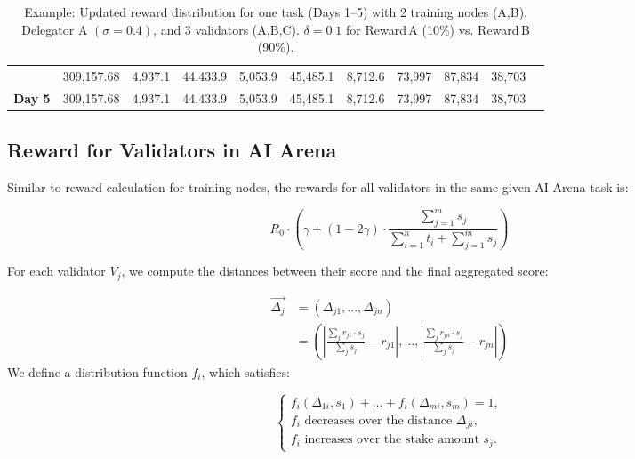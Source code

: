 \documentclass[conference]{IEEEtran}
\newcommand{\SNT}{{AI Arena}\xspace}
\begin{document}
\begin{table}[t]
{\begin{tabular}{lcccccccccc}
& 309,157.68 
& \cellcolor{lightbrown}4,937.1 
& \cellcolor{lightbrown}44,433.9 
& \cellcolor{lightgray}5,053.9 
& \cellcolor{lightgray}45,485.1
& \cellcolor{lightblue}8,712.6
& \cellcolor{lightbrown}73,997 
& \cellcolor{lightgray}87,834 
& \cellcolor{lightblue}38,703 
\\
\textbf{Day 5} 
& 309,157.68 
& \cellcolor{lightbrown}4,937.1 
& \cellcolor{lightbrown}44,433.9 
& \cellcolor{lightgray}5,053.9 
& \cellcolor{lightgray}45,485.1
& \cellcolor{lightblue}8,712.6
& \cellcolor{lightbrown}73,997 
& \cellcolor{lightgray}87,834 
& \cellcolor{lightblue}38,703 
\\
\bottomrule
\end{tabular}
}
\caption{Example: Updated reward distribution for one task (Days 1--5) with 
2 training nodes (A,B), Delegator A \((\sigma=0.4)\), 
and 3 validators (A,B,C). \(\delta=0.1\) for Reward\,A (10\%) vs. Reward\,B (90\%).}
\label{tab:rewards_distribution-table2}
\end{table}

\subsection{Reward for Validators in \SNT}\label{sec: reward-for-validators}

Similar to reward calculation for training nodes, the rewards for all validators in the same given AI Arena task is:

    $$R_0 \cdot \left( \gamma + (1 - 2\gamma) \cdot \frac{\sum_{j=1}^{m} s_j}{\sum_{i=1}^{n} t_i + \sum_{j=1}^{m} s_j} \right)$$

For each validator $V_j$, we compute the distances between their score and the final aggregated score:

\begin{equation*}
    \begin{aligned}
         \vec{\Delta_j} &= \left(\Delta_{j1}, ..., \Delta_{jn}\right)\\
         &= \left(\left|{\frac{\sum_j{r_{j1}\cdot s_j}}{\sum_j{s_j}}}-r_{j1}\right|, ..., \left|\frac{\sum_j{r_{jn}\cdot s_j}}{\sum_j{s_j}} - r_{jn}\right|\right) 
    \end{aligned}
\end{equation*}
We define a distribution function $f_i$, which satisfies: 
 
\[
\left\{
\begin{array}{l}
 f_i(\Delta_{1i}, s_1) + \ldots + f_i(\Delta_{mi}, s_m) = 1, \\
 f_i \text{ decreases over the distance } \Delta_{ji}, \\
 f_i \text{ increases over the stake amount } s_j.
\end{array}
\right.
\]
\end{document}
